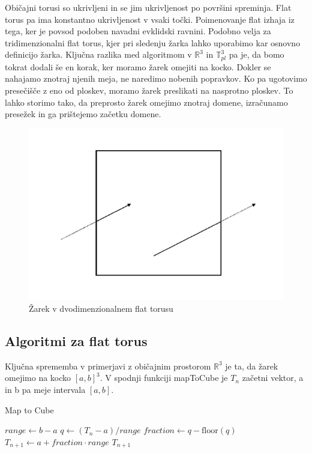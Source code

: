 \documentclass[titlepage]{article}
\begin{document}
Običajni torusi so ukrivljeni in se jim ukrivljenost po površini spreminja. Flat torus pa ima konstantno ukrivljenost v vsaki točki. Poimenovanje flat izhaja iz tega, ker je povsod podoben navadni evklidski ravnini. Podobno velja za tridimenzionalni flat torus, kjer pri sledenju žarka lahko uporabimo kar osnovno definicijo žarka. Ključna razlika med algoritmom v \( \mathbb{R}^3 \) in \( \mathbb{T}^3_{pl} \) pa je, da bomo tokrat dodali še en korak, ker moramo žarek omejiti na kocko. Dokler se nahajamo znotraj njenih meja, ne naredimo nobenih popravkov. Ko pa ugotovimo presečišče z eno od ploskev, moramo žarek preslikati na nasprotno ploskev. To lahko storimo tako, da preprosto žarek omejimo znotraj domene, izračunamo presežek in ga prištejemo začetku domene.

\begin{figure}[H]
    \centering
    \includegraphics[width=0.5\linewidth]{Images/flat_torus_zrcaljenje.png}
    \caption{Žarek v dvodimenzionalnem flat torusu}
    \label{Slika:Žarek v dvodimenzionalnem flat torusu}
\end{figure}
\subsection{Algoritmi za flat torus}
Ključna sprememba v primerjavi z običajnim prostorom $\mathbb{R}^{3}$ je ta, da žarek omejimo na kocko $[a,b]^{3}$. V spodnji funkciji mapToCube je $T_{n}$ začetni vektor, a in b pa meje intervala $[a,b]$.
\begin{algorithm}[H]
\caption{Map to Cube}\label{alg:mapToCube}
\begin{algorithmic}[1]
    \State $range \gets b - a$
    \State $q \gets (T_{n} - a) / range$
    \State $fraction \gets q - \text{floor}(q)$
    \State $T_{n+1} \gets a + fraction \cdot range$
    \State \Return $T_{n+1}$
\EndFunction
\end{algorithmic}
\end{algorithm}
\end{document}
